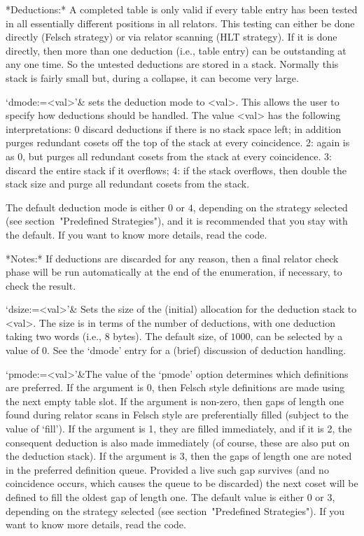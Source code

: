 *Deductions:*
A completed table is only valid if every table entry has been tested in all
essentially different positions in all relators.  This testing can either be
done directly (Felsch strategy) or via relator scanning (HLT strategy).  If
it is done directly, then more than one deduction (i.e., table entry) can be
outstanding at any one time.  So the untested deductions are stored in a
stack.  Normally this stack is fairly small but, during a collapse, it can
become very large.

\beginitems
`dmode:=<val>'&
sets the deduction mode to <val>.  This allows the user to specify how
deductions should be handled.  The value <val> has the following
interpretations: 0 discard deductions if there is no stack space left; in
addition purges redundant cosets off the top of the stack at every
coincidence. 
2: again is as 0,
but purges all redundant cosets from the stack at 
every coincidence.
3: discard the entire stack if it overflows;
4: if the stack overflows, then double the stack size and purge all
  redundant cosets from the stack.

The default deduction mode is either $0$ or $4$, depending on the strategy
selected (see section~"Predefined Strategies"), and it is recommended that
you stay with the default.  If you want to know more details, read the code.

*Notes:*
If deductions are discarded for any reason, then a final relator
check phase will
be run automatically at the end of the enumeration, if necessary, to check
the result.

`dsize:=<val>'&
Sets the size of the (initial) allocation for the deduction stack to <val>.
The size is in terms of the number of deductions, with one deduction
  taking two words (i.e., 8 bytes).
The default size, of $1000$, can be selected by a value of 0.
See the `dmode' entry for a (brief) discussion of deduction handling.

`pmode:=<val>'&The value of the `pmode' option determines which definitions
are preferred.  If the argument is 0, then Felsch style definitions are made
using the next empty table slot.  If the argument is non-zero, then gaps of
length one found during relator scans in Felsch style are preferentially
filled (subject to the value of `fill').  If the argument is 1, they are
filled immediately, and if it is 2, the consequent deduction is also made
immediately (of course, these are also put on the deduction stack).  If the
argument is 3, then the gaps of length one
are noted in the preferred definition queue.
Provided a live such gap survives (and no coincidence occurs, which causes
the queue to be discarded) the next coset will be defined to fill the oldest
gap of length one.  The default value is either 0 or 3, depending on the
strategy selected (see section~"Predefined Strategies").  If you want to
know more details, read the code.

